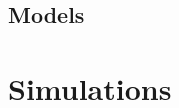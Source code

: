 \documentclass[12pt,a4paper]{report}
\begin{document}
\subsection{Models}

\section{Simulations}


%
%
%
%
%
%
%
%
%
\end{document}
